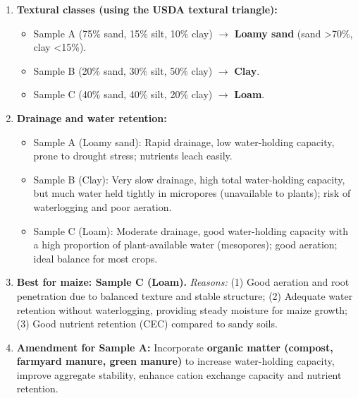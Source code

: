 \documentclass[11pt]{article}
\begin{document}
\begin{corrige}
\begin{enumerate}
\item \textbf{Textural classes (using the USDA textural triangle):}
\begin{itemize}
\item Sample A (75\% sand, 15\% silt, 10\% clay) $\to$ \textbf{Loamy sand} (sand >70\%, clay <15\%).
\item Sample B (20\% sand, 30\% silt, 50\% clay) $\to$ \textbf{Clay}.
\item Sample C (40\% sand, 40\% silt, 20\% clay) $\to$ \textbf{Loam}.
\end{itemize}
\item \textbf{Drainage and water retention:}
\begin{itemize}
\item Sample A (Loamy sand): Rapid drainage, low water-holding capacity, prone to drought stress; nutrients leach easily.
\item Sample B (Clay): Very slow drainage, high total water-holding capacity, but much water held tightly in micropores (unavailable to plants); risk of waterlogging and poor aeration.
\item Sample C (Loam): Moderate drainage, good water-holding capacity with a high proportion of plant-available water (mesopores); good aeration; ideal balance for most crops.
\end{itemize}
\item \textbf{Best for maize: Sample C (Loam).}  
  \textit{Reasons:} (1) Good aeration and root penetration due to balanced texture and stable structure; (2) Adequate water retention without waterlogging, providing steady moisture for maize growth; (3) Good nutrient retention (CEC) compared to sandy soils.
\item \textbf{Amendment for Sample A:} Incorporate \textbf{organic matter (compost, farmyard manure, green manure)} to increase water-holding capacity, improve aggregate stability, enhance cation exchange capacity and nutrient retention.
\end{enumerate}
\end{corrige}
\end{document}

